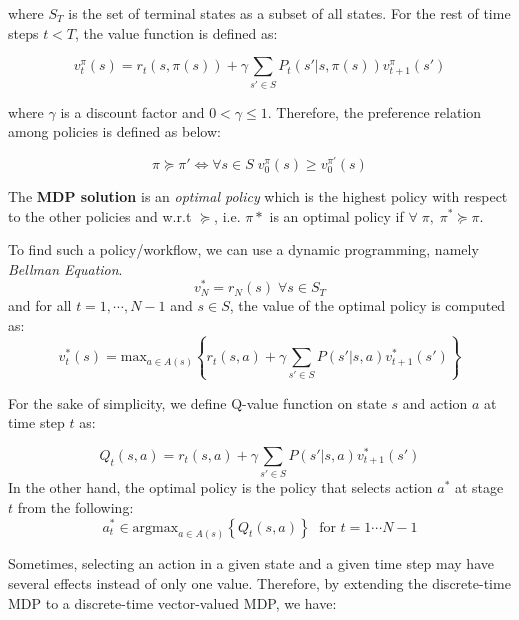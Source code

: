 \documentclass[10pt,journal,compsoc]{IEEEtran}
\begin{document}
where $S_T$ is the set of terminal states as a subset of all states. %
For the rest of time steps $t<T$, the value function is defined as:

\begin{equation}\label{eq:value-func}
v^{\pi}_t(s) =  r_t(s,\pi(s)) + \gamma \sum_{s' \in S} P_t(s'|s,\pi(s)) v_{t+1}^{\pi}(s')
\end{equation}

where $\gamma$ is a discount factor and $ 0 < \gamma \leq 1$. Therefore, the preference relation among policies is defined as below:

\begin{equation}
\pi \succeq \pi' \Leftrightarrow \forall s \in S \; v_0^{\pi}(s) \geq v_0^{\pi'}(s)
\end{equation}

The \textbf{MDP solution} is an \emph{optimal policy} which is the highest policy with respect to the other policies and w.r.t $\succeq$, i.e. $\pi *$ is an optimal policy if $\forall \; \pi, \; \pi^* \succeq \pi$.


To find such a policy/workflow, we can use a dynamic programming, namely \emph{Bellman Equation}. 
\begin{equation}
v_N^* = r_N(s) \; \forall s\in S_T
\end{equation}
%
and for all $t= 1, \cdots, N-1$ and $s \in S$, the value of the optimal policy is computed as:
\begin{equation}\label{eq:bellman}
v_t^*(s) =\text{max}_{a \in A(s)} \left \{ r_t(s,a) + \gamma \sum_{s' \in S} P(s'|s,a) v_{t+1}^*(s') \right \} 
\end{equation}

For the sake of simplicity, we define Q-value function on state $s$ and action $a$ at time step $t$ as:

\begin{equation}
Q_t(s,a) = r_t(s,a) + \gamma \sum_{s' \in S} P(s'|s,a) v_{t+1}^*(s')
\end{equation}
In the other hand, the optimal policy is the policy that selects action $a^*$ at stage $t$ from the following:
\begin{equation}\label{eq:opt-action}
a^*_t \in \text{argmax}_{a \in A(s)} \left \{ Q_t(s,a) \right \} \; \text{ for } t=1 \cdots N-1
\end{equation}

Sometimes, selecting an action in a given state and a given time step may have several effects instead of only one value. Therefore, by extending the discrete-time MDP to a discrete-time vector-valued MDP, we have: \\
\end{document}
